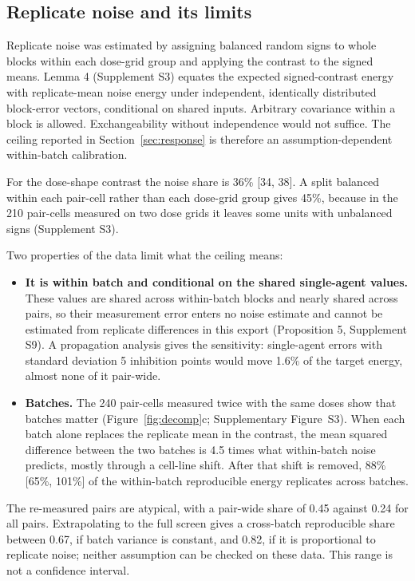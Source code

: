 \documentclass[11pt]{article}
\begin{document}
\subsection{Replicate noise and its limits}\label{sec:noise}
Replicate noise was estimated by assigning balanced random signs to whole blocks within each dose-grid group and applying the contrast to the signed means. Lemma 4 (Supplement S3) equates the expected signed-contrast energy with replicate-mean noise energy under independent, identically distributed block-error vectors, conditional on shared inputs. Arbitrary covariance within a block is allowed. Exchangeability without independence would not suffice. The ceiling reported in Section~\ref{sec:response} is therefore an assumption-dependent within-batch calibration.

For the dose-shape contrast the noise share is 36\% [34, 38]. A split balanced within each pair-cell rather than each dose-grid group gives 45\%, because in the 210 pair-cells measured on two dose grids it leaves some units with unbalanced signs (Supplement S3).

Two properties of the data limit what the ceiling means:
\begin{itemize}
\item \textbf{It is within batch and conditional on the shared single-agent values.} These values are shared across within-batch blocks and nearly shared across pairs, so their measurement error enters no noise estimate and cannot be estimated from replicate differences in this export (Proposition 5, Supplement S9). A propagation analysis gives the sensitivity: single-agent errors with standard deviation 5 inhibition points would move 1.6\% of the target energy, almost none of it pair-wide.
\item \textbf{Batches.} The 240 pair-cells measured twice with the same doses show that batches matter (Figure~\ref{fig:decomp}c; Supplementary Figure~S3). When each batch alone replaces the replicate mean in the contrast, the mean squared difference between the two batches is 4.5 times what within-batch noise predicts, mostly through a cell-line shift. After that shift is removed, 88\% [65\%, 101\%] of the within-batch reproducible energy replicates across batches.
\end{itemize}
The re-measured pairs are atypical, with a pair-wide share of 0.45 against 0.24 for all pairs. Extrapolating to the full screen gives a cross-batch reproducible share between 0.67, if batch variance is constant, and 0.82, if it is proportional to replicate noise; neither assumption can be checked on these data. This range is not a confidence interval.
\end{document}
